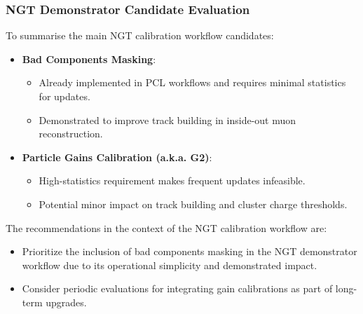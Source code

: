 \subsubsection{NGT Demonstrator Candidate Evaluation}

To summarise the main NGT calibration workflow candidates:
\begin{itemize}
    \item \textbf{Bad Components Masking}:
    \begin{itemize}
        \item Already implemented in PCL workflows and requires minimal statistics for updates.
        \item Demonstrated to improve track building in inside-out muon reconstruction.
    \end{itemize}
    \item \textbf{Particle Gains Calibration (a.k.a. G2)}:
    \begin{itemize}
        \item High-statistics requirement makes frequent updates infeasible.
        \item Potential minor impact on track building and cluster charge thresholds.
    \end{itemize}
\end{itemize}

The recommendations in the context of the NGT calibration workflow are:
\begin{itemize}
    \item Prioritize the inclusion of bad components masking in the NGT demonstrator workflow due to its operational simplicity and demonstrated impact.
    \item Consider periodic evaluations for integrating gain calibrations as part of long-term upgrades.
\end{itemize}